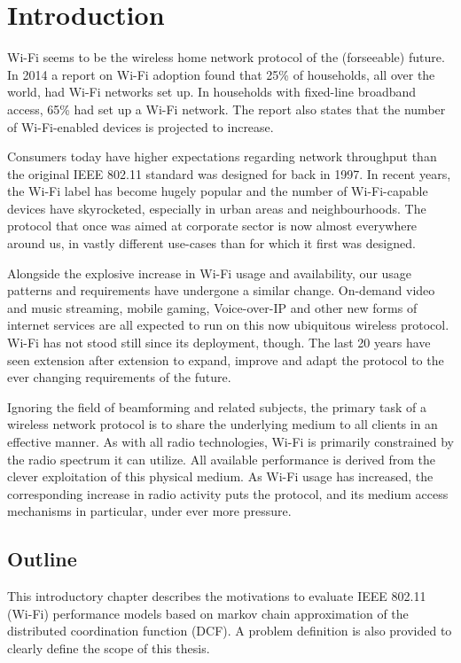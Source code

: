 
\chapter{Introduction}

Wi-Fi seems to be the wireless home network protocol of the (forseeable)
future. In 2014 a report on Wi-Fi adoption found that 25\% of households, all
over the world, had Wi-Fi networks set up. In households with fixed-line
broadband access, 65\% had set up a Wi-Fi network\cite{smith}. The report also
states that the number of Wi-Fi-enabled devices is projected to increase.

Consumers today have higher expectations regarding network throughput than the
original IEEE 802.11 standard was designed for back in 1997. In recent years,
the Wi-Fi label has become hugely popular and the number of Wi-Fi-capable
devices have skyrocketed, especially in urban areas and neighbourhoods. The
protocol that once was aimed at corporate sector is now almost everywhere
around us, in vastly different use-cases than for which it first was designed.

Alongside the explosive increase in Wi-Fi usage and availability, our usage
patterns and requirements have undergone a similar change. On-demand video and
music streaming, mobile gaming, Voice-over-IP and other new forms of internet
services are all expected to run on this now ubiquitous wireless protocol.
Wi-Fi has not stood still since its deployment, though. The last 20 years have seen
extension after extension to expand, improve and adapt the protocol to the
ever changing requirements of the future.

Ignoring the field of beamforming and related subjects, the primary task of a
wireless network protocol is to share the underlying medium to all clients in
an effective manner. As with all radio technologies, Wi-Fi is primarily
constrained by the radio spectrum it can utilize. All available performance is
derived from the clever exploitation of this physical medium. As Wi-Fi usage
has increased, the corresponding increase in radio activity puts the protocol,
and its medium access mechanisms in particular, under ever more pressure.

\section{Outline}

This introductory chapter describes the motivations to evaluate IEEE 802.11
(Wi-Fi) performance models based on markov chain approximation of the
distributed coordination function (DCF). A problem definition is also provided
to clearly define the scope of this thesis.

